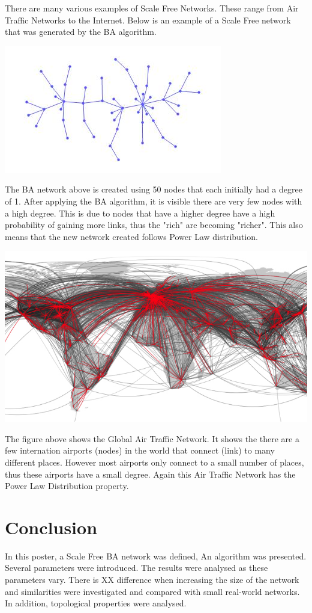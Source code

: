 \documentclass[a0,final]{a0poster}
\begin{document}
\begin{multicols}{3}
There are many various examples of Scale Free Networks. These range from Air Traffic Networks to the Internet. Below is an example of a Scale Free network that was generated by the BA algorithm.
\newline
{\centering
\centerline{\includegraphics[scale=1.5]{BA.jpg}}}
\newline
The BA network above is created using 50 nodes that each initially had a degree of 1.
After applying the BA algorithm, it is visible there are very few nodes with a high degree. This is due to nodes that have a higher degree have a high probability of gaining more links, thus the "rich" are becoming "richer". This also means that the new network created follows Power Law distribution.
\newline

\centerline{\includegraphics{airtraffic.jpg}}

The figure above shows the Global Air Traffic Network. It shows the there are a few internation airports (nodes) in the world that connect (link) to many different places. However most airports only connect to a small number of places, thus these airports have a small degree. Again this Air Traffic Network has the Power Law Distribution property.

\section{Conclusion}
In this poster, a Scale Free BA network was defined, An algorithm was presented. Several parameters were introduced. The results were analysed as these parameters vary. There is XX difference when increasing the size of the network and similarities were investigated and compared with small real-world networks. In addition, topological properties were analysed. 




\end{multicols}
\end{document}
